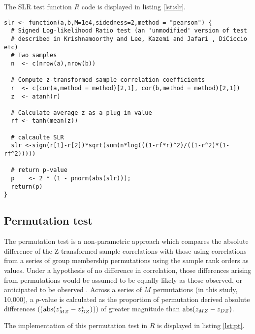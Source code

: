 The SLR test function $R$ code is displayed in listing \ref{lst:slr}.

\begin{lstlisting}[float=h,caption={Signed log-likelihood ratio test},label={lst:slr}]
slr <- function(a,b,M=1e4,sidedness=2,method = "pearson") {
  # Signed Log-likelihood Ratio test (an 'unmodified' version of test 
  # described in Krishnamoorthy and Lee, Kazemi and Jafari , DiCiccio etc)
  # Two samples
  n  <- c(nrow(a),nrow(b))
  
  # Compute z-transformed sample correlation coefficients
  r  <- c(cor(a,method = method)[2,1], cor(b,method = method)[2,1])
  z  <- atanh(r)
  
  # Calculate average z as a plug in value
  rf <- tanh(mean(z))
  
  # calcaulte SLR
  slr <-sign(r[1]-r[2])*sqrt(sum(n*log(((1-rf*r)^2)/((1-r^2)*(1-rf^2)))))
  
  # return p-value
  p    <- 2 * (1 - pnorm(abs(slr))); 
  return(p)
}
\end{lstlisting}

\subsection{Permutation test}
The permutation test is a non-parametric approach which compares the absolute 
difference of the Z-transformed sample correlations with those using correlations 
from a series of group membership permutations using the sample rank orders as 
values.  Under a hypothesis of no difference in correlation, those differences arising from permutations would be assumed to be equally likely as those observed, or anticipated to be observed \cite{Efron1993}.  Across a series of $M$ permutations (in this study, 10,000), a $p$-value is calculated as the proportion of permutation derived absolute differences (($\operatorname{abs}(z_{MZ}^* - z_{DZ}^*)$)) of greater magnitude than $\operatorname{abs}(z_{MZ} - z_{DZ})$.

The implementation of this permutation test in $R$ is displayed in listing \ref{lst:pt}.

